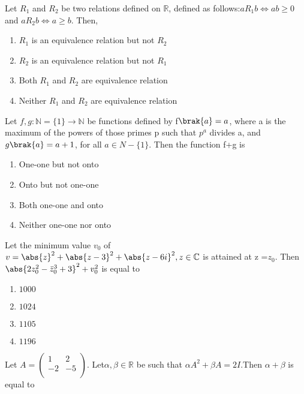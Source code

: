 \iffalse
\title{2022}
\author{AI24BTECH11006}
\section{mcq-single}
\fi
\item Let $R_1$ and $R_2$ be two relations defined on $\mathbb{R} $, defined as follows:$a R_1 b \iff ab \geq 0$ and $a R_2 b \iff a \geq b.$ Then,
	\hfill{}
	\begin{enumerate}
    \item  $R_1$ is an equivalence relation but not $R_2$
    \item  $R_2$ is an equivalence relation but not $R_1$
    \item  Both $R_1$ and $R_2$ are equivalence relation 
    \item  Neither $R_1$ and $R_2$ are equivalence relation
\end{enumerate}
\item Let $f,g : \mathbb{N} = \{1\} \rightarrow \mathbb{N}$ be functions defined by f$\brak{a}=a$, where a is the maximum of the powers of those primes p such that $p^a$ divides a, and $g\brak{a}=a+1$, for all $a \in N-\{1\}$. Then the function f+g is 
\hfill{}
	\begin{enumerate}
    \item One-one but not onto
    \item Onto but not one-one
    \item Both one-one and onto
    \item Neither one-one nor onto
\end{enumerate}
\item Let the minimum value $v_0$ of $v= \abs{z}^2 + \abs{z - 3}^2 + \abs{z - 6i}^2, z \in \mathbb {C}$ is attained at z =$z_0$. Then $\abs{2z_0^2 - \bar{z}_0^3 + 3 }^2 + v_0^2$ is equal to
\hfill{}
	\begin{enumerate}
    \item $1000$
    \item $1024$
    \item $1105$
    \item $1196$
\end{enumerate}
\item  Let $A = \begin{pmatrix}1 & 2 \\-2 & -5 \\\end{pmatrix}$. Let$\alpha, \beta \in \mathbb {R}$ be such that $
\alpha A^2 + \beta A = 2I$.Then $ \alpha + \beta $ is equal to
